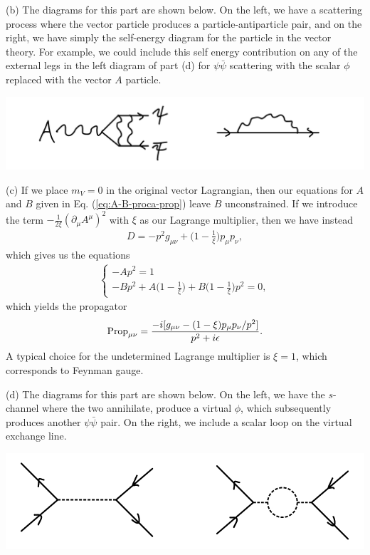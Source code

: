 {(b) The diagrams for this part are shown below.
On the left, we have a scattering process where the vector particle produces a particle-antiparticle pair, and on the right, we have simply the self-energy diagram for the particle in the vector theory.
For example, we could include this self energy contribution on any of the external legs in the left diagram of part (d) for $\psi \bar{\psi}$ scattering with the scalar $\phi$ replaced with the vector $A$ particle.

\begin{center}
    \includegraphics[width=\linewidth]{part_b.jpeg}
\end{center}

(c) If we place $m_{V} = 0$ in the original vector Lagrangian, then our equations for $A$ and $B$ given in Eq. (\ref{eq:A-B-proca-prop}) leave $B$ unconstrained.
If we introduce the term $-\frac{1}{2 \xi} (\partial_{\mu} A^{\mu})^2$ with $\xi$ as our Lagrange multiplier, then we have instead
\begin{align}
    D = - p^2 g_{\mu\nu} + \Big( 1 - \frac{1}{\xi} \Big) p_{\mu} p_{\nu}
,\end{align}
which gives us the equations
\begin{align}
\begin{cases}
    - A p^2 = 1 \\
    - B p^2 + A \Big( 1 - \frac{1}{\xi} \Big) + B \Big( 1 - \frac{1}{\xi} \Big) p^2 = 0
,\end{cases}
\end{align}
which yields the propagator
\begin{align}
    {\rm Prop}_{\mu\nu} = \frac{-i [ g_{\mu\nu} - (1 - \xi) p_{\mu} p_{\nu} / p^2 ]}{p^2 + i \epsilon}
.\end{align}
A typical choice for the undetermined Lagrange multiplier is $\xi = 1$, which corresponds to Feynman gauge.


(d) The diagrams for this part are shown below.
On the left, we have the $s$-channel where the two annihilate, produce a virtual $\phi$, which subsequently produces another $\psi \bar{\psi}$ pair.
On the right, we include a scalar loop on the virtual exchange line.

\begin{center}
    \includegraphics[width=\linewidth]{part_d.jpeg}
\end{center}


}
